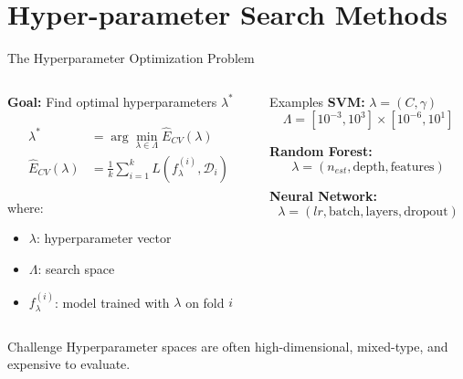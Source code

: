 \documentclass[8pt,aspectratio=1610]{beamer}
\begin{document}

\section{Hyper-parameter Search Methods}

\begin{frame}{The Hyperparameter Optimization Problem}
\begin{columns}[t]
\begin{column}{0.55\textwidth}
\textbf{Goal:} Find optimal hyperparameters $\lambda^*$

\begin{align}
\lambda^* &= \arg\min_{\lambda \in \Lambda} \hat{E}_{CV}(\lambda) \\
\hat{E}_{CV}(\lambda) &= \frac{1}{k}\sum_{i=1}^k L(f_\lambda^{(i)}, \mathcal{D}_i)
\end{align}

where:
\begin{itemize}
\item $\lambda$: hyperparameter vector
\item $\Lambda$: search space
\item $f_\lambda^{(i)}$: model trained with $\lambda$ on fold $i$
\end{itemize}
\end{column}

\begin{column}{0.41\textwidth}
\begin{block}{Examples}
\textbf{SVM:} $\lambda = (C, \gamma)$
$$\Lambda = [10^{-3}, 10^3] \times [10^{-6}, 10^1]$$

\textbf{Random Forest:}
$$\lambda = (n_{est}, \text{depth}, \text{features})$$

\textbf{Neural Network:}
$$\lambda = (lr, \text{batch}, \text{layers}, \text{dropout})$$
\end{block}
\end{column}
\end{columns}

\vspace{0.3cm}

\begin{alertblock}{Challenge}
Hyperparameter spaces are often high-dimensional, mixed-type, and expensive to evaluate.
\end{alertblock}
\end{frame}
\end{document}
